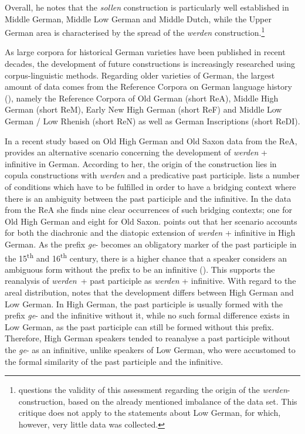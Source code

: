 \documentclass[output=paper,colorlinks,citecolor=brown]{langscibook}
\begin{document}
Overall, he notes that the \textit{sollen} construction is particularly well established in Middle German, Middle Low German and Middle Dutch, while the Upper German area is characterised by the spread of the \textit{werden} construction.\footnote{\citet{Westvik2000} questions the validity of this assessment regarding the origin of the \textit{werden}-construction, based on the already mentioned imbalance of the data set. This critique does not apply to the statements about Low German, for which, however, very little data was collected.}

As large corpora for historical German varieties have been published in recent decades, the development of future constructions is increasingly researched using corpus-linguistic methods. Regarding older varieties of German, the largest amount of data comes from the Reference Corpora on German language history (\cite{Ihdenetal2023}), namely the Reference Corpora of Old German (short ReA), Middle High German (short ReM), Early New High German (short ReF) and Middle Low German / Low Rhenish (short ReN) as well as German Inscriptions (short ReDI).

\largerpage[-1]

In a recent study based on Old High German and Old Saxon data from the ReA, \citet{Jäger2024} provides an alternative scenario concerning the development of \textit{werden} + infinitive in German. According to her, the origin of the construction lies in copula constructions with \textit{werden} and a predicative past participle. \citet[189]{Jäger2024} lists a number of conditions which have to be fulfilled in order to have a bridging context where there is an ambiguity between the past participle and the infinitive. In the data from the ReA she finds nine clear occurrences of such bridging contexts; one for Old High German and eight for Old Saxon. \citet[183]{Jäger2024} points out that her scenario accounts for both the diachronic and the diatopic extension of \textit{werden} + infinitive in High German. As the prefix \textit{ge}- becomes an obligatory marker of the past participle in the 15\textsuperscript{th} and 16\textsuperscript{th} century, there is a higher chance that a speaker considers an ambiguous form without the prefix to be an infinitive (\cite[229]{Jäger2024}). This supports the reanalysis of \textit{werden}~+ past participle as \textit{werden} + infinitive. With regard to the areal distribution, \citet[230]{Jäger2024} notes that the development differs between High German and Low German. In High German, the past participle is usually formed with the prefix \textit{ge}- and the infinitive without it, while no such formal difference exists in Low German, as the past participle can still be formed without this prefix. Therefore, High German speakers tended to reanalyse a past participle without the \textit{ge}- as an infinitive, unlike speakers of Low German, who were accustomed to the formal similarity of the past participle and the infinitive.
\end{document}
